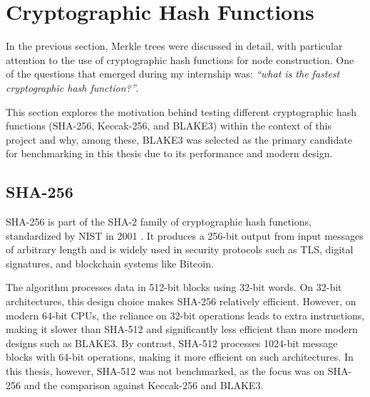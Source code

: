 \section{Cryptographic Hash Functions}\label{sec:cryptopgrahic-hash-functions}

In the previous section, Merkle trees were discussed in detail, with particular attention to the use of cryptographic hash functions for node construction.  
One of the questions that emerged during my internship was: \emph{``what is the fastest cryptographic hash function?''}.  


This section explores the motivation behind testing different cryptographic hash functions (SHA-256, Keccak-256, and BLAKE3) within the context of this project and why, among these, BLAKE3 was selected as the primary candidate for benchmarking in this thesis due to its performance and modern design.  

\subsection{SHA-256}

SHA-256 is part of the SHA-2 family of cryptographic hash functions, standardized by NIST in 2001 \cite{penard2008secure}.
It produces a 256-bit output from input messages of arbitrary length and is widely used in security protocols such as TLS, digital signatures, and blockchain systems like Bitcoin.

The algorithm processes data in 512-bit blocks using 32-bit words. On 32-bit architectures, this design choice makes SHA-256 relatively efficient. However, on modern 64-bit CPUs, the reliance on 32-bit operations leads to extra instructions, making it slower than SHA-512 and significantly less efficient than more modern designs such as BLAKE3. By contrast, SHA-512 processes 1024-bit message blocks with 64-bit operations, making it more efficient on such architectures. In this thesis, however, SHA-512 was not benchmarked, as the focus was on SHA-256 and the comparison against Keccak-256 and BLAKE3.

